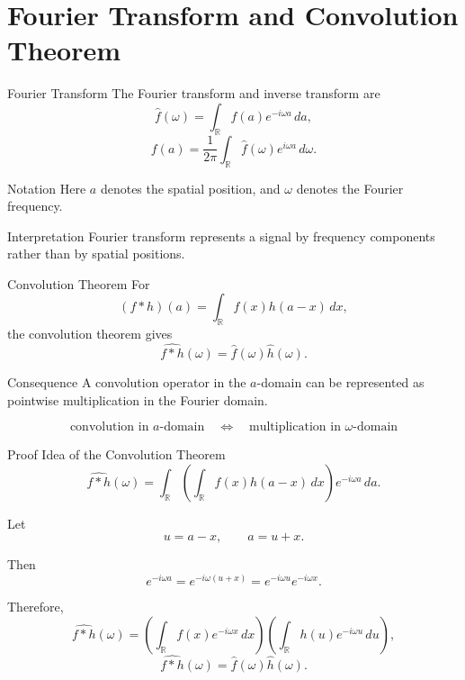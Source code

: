 \documentclass[aspectratio=1610,xcolor=dvipsnames,t]{beamer}
\newcommand{\R}{\mathbb{R}}
\begin{document}
\section[Fourier]{Fourier Transform and Convolution Theorem}

\begin{frame}{Fourier Transform}
The Fourier transform and inverse transform are
\[
\widehat f(\omega)
=
\int_{\R}
f(a)e^{-i\omega a}\,da,
\]
\[
f(a)
=
\frac{1}{2\pi}
\int_{\R}
\widehat f(\omega)e^{i\omega a}\,d\omega.
\]

\begin{block}{Notation}
Here $a$ denotes the spatial position, and $\omega$ denotes the Fourier frequency.
\end{block}

\begin{block}{Interpretation}
Fourier transform represents a signal by frequency components rather than by spatial positions.
\end{block}
\end{frame}


\begin{frame}{Convolution Theorem}
For
\[
(f*h)(a)
=
\int_{\R}
f(x)h(a-x)\,dx,
\]
the convolution theorem gives
\[
\widehat{f*h}(\omega)
=
\widehat f(\omega)\widehat h(\omega).
\]

\begin{block}{Consequence}
A convolution operator in the $a$-domain can be represented as pointwise multiplication in the Fourier domain.
\end{block}

\[
\text{convolution in } a\text{-domain}
\quad\Longleftrightarrow\quad
\text{multiplication in } \omega\text{-domain}
\]
\end{frame}


\begin{frame}{Proof Idea of the Convolution Theorem}
\[
\widehat{f*h}(\omega)
=
\int_{\R}
\left(
\int_{\R}
f(x)h(a-x)\,dx
\right)
e^{-i\omega a}\,da.
\]

Let
\[
u=a-x,
\qquad
a=u+x.
\]

Then
\[
e^{-i\omega a}
=
e^{-i\omega(u+x)}
=
e^{-i\omega u}e^{-i\omega x}.
\]

Therefore,
\[
\widehat{f*h}(\omega)
=
\left(
\int_{\R}
f(x)e^{-i\omega x}\,dx
\right)
\left(
\int_{\R}
h(u)e^{-i\omega u}\,du
\right),
\]
\[
\widehat{f*h}(\omega)
=
\widehat f(\omega)\widehat h(\omega).
\]
\end{frame}
\end{document}

